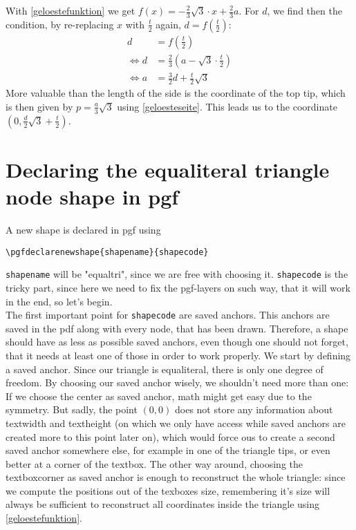 \documentclass[12pt]{article}
\begin{document}
With \autoref{geloestefunktion} we get $f(x)=-\frac{2}{3}\sqrt{3}\cdot x+\frac{2}{3}a$. For $d$, we find then the condition, by re-replacing $x$ with $\frac{t}{2}$ again, $d=f\left(\frac{t}{2}\right)$:
\begin{align}
d&=f\left(\frac{t}{2}\right)\nonumber\\
\Leftrightarrow d&=\frac{2}{3}\left(a-\sqrt{3}\cdot\frac{t}{2}\right)\nonumber\\
\Leftrightarrow a&=\frac{3}{2}d+\frac{t}{2}\sqrt{3}\label{geloesteseite}
\end{align}
More valuable than the length of the side is the coordinate of the top tip, which is then given by $p=\frac{a}{3}\sqrt{3}$ using \autoref{geloesteseite}. This leads us to the coordinate $(0,\frac{d}{2}\sqrt{3}+\frac{t}{2})$.
\section{Declaring the equaliteral triangle node shape in pgf}
A new shape is declared in pgf using
\begin{lstlisting}[mathescape]
\pgfdeclarenewshape{shapename}{shapecode}
\end{lstlisting}
\noindent \lstinline{shapename} will be "equaltri", since we are free with choosing it. \lstinline{shapecode} is the tricky part, since here we need to fix the pgf-layers on such way, that it will work in the end, so let's begin.\\
The first important point for \lstinline{shapecode} are saved anchors. This anchors are saved in the pdf along with every node, that has been drawn. Therefore, a shape should have as less as possible saved anchors, even though one should not forget, that it needs at least one of those in order to work properly. We start by defining a saved anchor. Since our triangle is equaliteral, there is only one degree of freedom. By choosing our saved anchor wisely, we shouldn't need more than one:\\
If we choose the center as saved anchor, math might get easy due to the symmetry. But sadly, the point $(0,0)$ does not store any information about textwidth and textheight (on which we only have access while saved anchors are created more to this point later on), which would force ous to create a second saved anchor somewhere else, for example in one of the triangle tips, or even better at a corner of the textbox. The other way around, choosing the textboxcorner as saved anchor is enough to reconstruct the whole triangle: since we compute the positions out of the texboxes size, remembering it's size will always be sufficient to reconstruct all coordinates inside the triangle using \autoref{geloestefunktion}.\\
\end{document}
